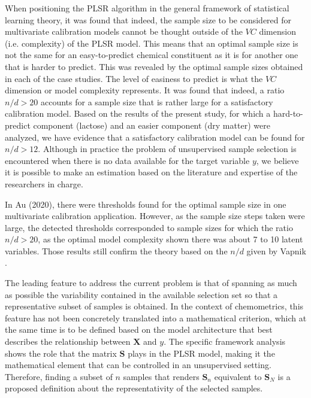 \documentclass[journal=ancham,manuscript=article]{achemso}
\begin{document}
When positioning the PLSR algorithm in the general framework of statistical learning theory, it was found that indeed, the sample size to be considered for multivariate calibration models cannot be thought outside of the $VC$ dimension (i.e. complexity) of the PLSR model. This means that an optimal sample size is not the same for an easy-to-predict chemical constituent as it is for another one that is harder to predict. This was revealed by the optimal sample sizes obtained in each of the case studies. The level of easiness to predict is what the $VC$ dimension or model complexity represents. It was found that indeed, a ratio $n/d>20$ accounts for a sample size that is rather large for a satisfactory calibration model. Based on the results of the present study, for which a hard-to-predict component (lactose) and an easier component (dry matter) were analyzed, we have evidence that a satisfactory calibration model can be found for $n/d>12$. Although in practice the problem of unsupervised sample selection is encountered when there is no data available for the target variable $y$, we believe it is possible to make an estimation based on the literature and expertise of the researchers in charge.

In Au (2020)\cite{Au2020}, there were thresholds found for the optimal sample size in one multivariate calibration application. However, as the sample size steps taken were large, the detected thresholds corresponded to sample sizes for which the ratio $n/d>20$, as the optimal model complexity shown there was about 7 to 10 latent variables. Those results still confirm the theory based on the $n/d$ given by Vapnik \cite{Vapnik2000}.

The leading feature to address the current problem is that of spanning as much as possible the variability contained in the available selection set so that a representative subset of samples is obtained. In the context of chemometrics, this feature has not been concretely translated into a mathematical criterion, which at the same time is to be defined based on the model architecture that best describes the relationship between $\mathbf{X}$ and $y$. The specific framework analysis shows the role that the matrix $\mathbf{S}$ plays in the PLSR model, making it the mathematical element that can be controlled in an unsupervised setting. Therefore, finding a subset of $n$ samples that renders $\mathbf{S}_n$ equivalent to $\mathbf{S}_N$ is a proposed definition about the representativity of the selected samples. 
\end{document}
